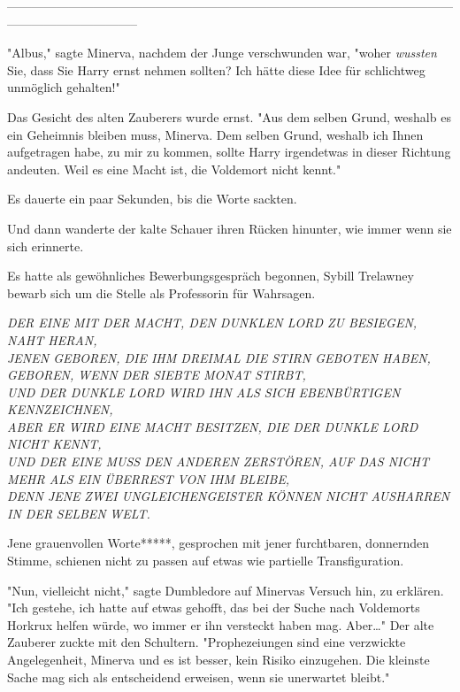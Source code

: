 {--------------------------------------------------------------------------------------------------------------------------------------------

"Albus," sagte Minerva, nachdem der Junge verschwunden war, "woher \emph{wussten} Sie, dass Sie Harry ernst nehmen sollten? Ich hätte diese Idee für schlichtweg unmöglich gehalten!"

Das Gesicht des alten Zauberers wurde ernst. "Aus dem selben Grund, weshalb es ein Geheimnis bleiben muss, Minerva. Dem selben Grund, weshalb ich Ihnen aufgetragen habe, zu mir zu kommen, sollte Harry irgendetwas in dieser Richtung andeuten. Weil es eine Macht ist, die Voldemort nicht kennt."

Es dauerte ein paar Sekunden, bis die Worte sackten.

Und dann wanderte der kalte Schauer ihren Rücken hinunter, wie immer wenn sie sich erinnerte.

Es hatte als gewöhnliches Bewerbungsgespräch begonnen, Sybill Trelawney bewarb sich um die Stelle als Professorin für Wahrsagen.

\emph{DER EINE MIT DER MACHT, DEN DUNKLEN LORD ZU BESIEGEN, NAHT HERAN,\\ JENEN GEBOREN, DIE IHM DREIMAL DIE STIRN GEBOTEN HABEN,\\ GEBOREN, WENN DER SIEBTE MONAT STIRBT,\\ UND DER DUNKLE LORD WIRD IHN ALS SICH EBENBÜRTIGEN KENNZEICHNEN,\\ ABER ER WIRD EINE MACHT BESITZEN, DIE DER DUNKLE LORD NICHT KENNT,\\ UND DER EINE MUSS DEN ANDEREN ZERSTÖREN, AUF DAS NICHT MEHR ALS EIN ÜBERREST VON IHM BLEIBE,\\ DENN JENE} \emph{ZWEI UNGLEICHENGEISTER} \emph{KÖNNEN NICHT AUSHARREN IN DER} \emph{SELBEN} \emph{WELT.}

Jene grauenvollen Worte*****, gesprochen mit jener furchtbaren, donnernden Stimme, schienen nicht zu passen auf etwas wie partielle Transfiguration.

"Nun, vielleicht nicht," sagte Dumbledore auf Minervas Versuch hin, zu erklären. "Ich gestehe, ich hatte auf etwas gehofft, das bei der Suche nach Voldemorts Horkrux helfen würde, wo immer er ihn versteckt haben mag. Aber…" Der alte Zauberer zuckte mit den Schultern. "Prophezeiungen sind eine verzwickte Angelegenheit, Minerva und es ist besser, kein Risiko einzugehen. Die kleinste Sache mag sich als entscheidend erweisen, wenn sie unerwartet bleibt."

}
